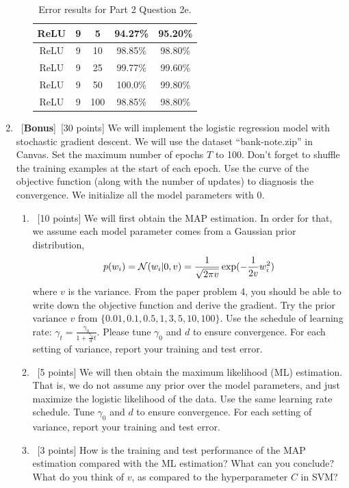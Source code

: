 \documentclass[12pt, fullpage,letterpaper]{article}
\begin{document}
\begin{enumerate}
\begin{enumerate}
\begin{table}[]
\begin{tabular}{c|cc|cc}
            ReLU & 9 & 5   & 94.27\% & 95.20\% \\ \hline
            ReLU & 9 & 10  & 98.85\% & 98.80\% \\ \hline
            ReLU & 9 & 25  & 99.77\% & 99.60\% \\ \hline
            ReLU & 9 & 50  & 100.0\% & 99.80\% \\ \hline
            ReLU & 9 & 100 & 98.85\% & 98.80\% \\ \hline
	     \end{tabular}
	     \caption{Error results for Part 2 Question 2e.}
	     \label{tab:my_label}
	 \end{table}
	
\end{enumerate} 

\item~[\textbf{Bonus}]~[30 points] We will implement the logistic regression model with stochastic gradient descent. We will use the  dataset ``bank-note.zip'' in Canvas.  Set the maximum number of epochs $T$ to 100. Don't forget to shuffle the training examples at the start of each epoch. Use the curve of the objective function (along with the number of updates) to diagnosis the convergence. We initialize all the model parameters with $0$.

\begin{enumerate}
	\item~[10 points] We will first obtain the MAP estimation. In order for that, we assume each model parameter comes from a Gaussian prior distribution, 
	\[
	p(w_i ) = \mathcal{N}(w_i |0, v)=\frac{1}{\sqrt{2\pi v}} \exp(-\frac{1}{2v}w_i^2)
	\]
	where $v$ is the variance.  From the paper problem 4, you should be able to write down  the objective function and derive the gradient. Try the prior variance $v$ from $\{0.01, 0.1, 0.5, 1, 3, 5, 10, 100\}$. 
	Use the schedule of learning rate: $\gamma_t = \frac{\gamma_0}{1+\frac{\gamma_0}{d}t}	$. Please tune $\gamma_0$ and $d$ to ensure convergence. For each setting of variance, report your training and test error. 
	\item~[5 points] We will then obtain the maximum likelihood (ML) estimation. That is, we do not assume any prior over the model parameters, and just maximize the logistic likelihood of the data. Use the same learning rate schedule. Tune $\gamma_0$ and $d$ to ensure convergence. For each setting of variance, report your training and test error. 
	
	\item~[3 points] How is the training and test performance of the MAP estimation compared with the ML estimation? What can you conclude? What do you think of $v$, as compared to  the hyperparameter $C$ in SVM?
\end{enumerate}


\end{enumerate}
\end{document}
